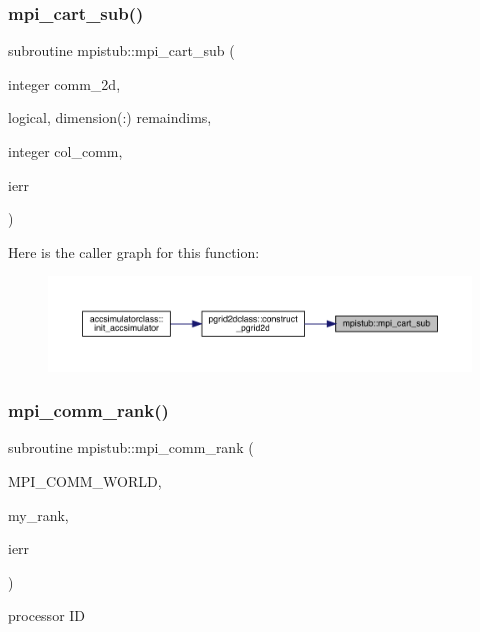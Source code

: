 \subsubsection{\texorpdfstring{mpi\_cart\_sub()}{mpi\_cart\_sub()}}
{\footnotesize\ttfamily subroutine mpistub\+::mpi\+\_\+cart\+\_\+sub (\begin{DoxyParamCaption}\item[{integer}]{comm\+\_\+2d,  }\item[{logical, dimension(\+:)}]{remaindims,  }\item[{integer}]{col\+\_\+comm,  }\item[{}]{ierr }\end{DoxyParamCaption})}

Here is the caller graph for this function\+:\nopagebreak
\begin{figure}[H]
\begin{center}
\leavevmode
\includegraphics[width=350pt]{namespacempistub_ab9ac48f74bbcdf05669e63852a220c09_icgraph}
\end{center}
\end{figure}
\mbox{\label{namespacempistub_a3085e38e0e5d38df633afc7b2d92cebb}} 
\subsubsection{\texorpdfstring{mpi\_comm\_rank()}{mpi\_comm\_rank()}}
{\footnotesize\ttfamily subroutine mpistub\+::mpi\+\_\+comm\+\_\+rank (\begin{DoxyParamCaption}\item[{}]{M\+P\+I\+\_\+\+C\+O\+M\+M\+\_\+\+W\+O\+R\+LD,  }\item[{}]{my\+\_\+rank,  }\item[{}]{ierr }\end{DoxyParamCaption})}



processor ID 

